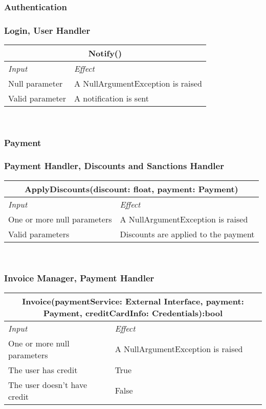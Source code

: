 	\label{sec: individual_steps_4}
	\subsubsection{Authentication}
		\subsubsection*{Login, User Handler }
			\begin{tabular}{ |l|l| }
				\hline
				\multicolumn{2}{|c|}{Notify()}\\
				\hline 
				\textit{Input}&\textit{Effect}\\ \hline
				Null parameter & A NullArgumentException is raised\\ \hline
				Valid parameter & A notification is sent \\ \hline
			\end{tabular}
			\\

	 \subsubsection{Payment}
		 \subsubsection*{Payment Handler, Discounts and Sanctions Handler }
			\begin{tabular}{ |l|l| }
				\hline
				\multicolumn{2}{|c|}{ApplyDiscounts(discount: float, payment: Payment)}\\
				\hline 
				\textit{Input}&\textit{Effect}\\ \hline
				One or more null parameters & A NullArgumentException is raised\\ \hline
				Valid parameters & Discounts are applied to the payment \\ \hline
			\end{tabular}
			\\
			
		\subsubsection*{Invoice Manager, Payment Handler}
			\begin{tabular}{ |l|l| }
				\hline
				\multicolumn{2}{|c|}{Invoice(paymentService: External Interface, payment: Payment, creditCardInfo: Credentials):bool}\\
				\hline 
				\textit{Input}&\textit{Effect}\\ \hline
				One or more null parameters & A NullArgumentException is raised\\ \hline
				The user has credit & True \\ \hline
				The user doesn't have credit & False \\ \hline
			\end{tabular}
			\\
			
